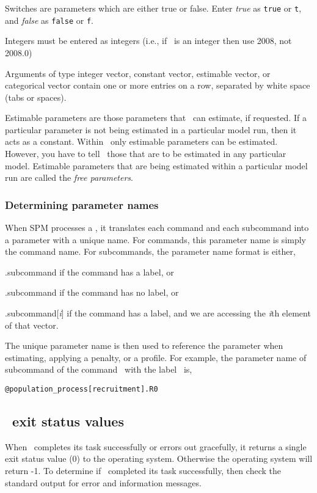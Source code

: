 Switches are parameters which are either true or false. Enter \emph{true} as \texttt{true} or \texttt{t}, and \emph{false} as \texttt{false} or \texttt{f}. 

Integers must be entered as integers (i.e., if \ is an integer then use 2008, not 2008.0)

Arguments of type integer vector, constant vector, estimable vector, or categorical vector contain one or more entries on a row, separated by white space (tabs or spaces). 

Estimable parameters are those parameters that \SPM\ can estimate, if requested. If a particular parameter is not being estimated in a particular model run, then it acts as a constant.  Within \SPM\, only estimable parameters can be estimated. However, you have to tell \SPM\ those that are to be estimated in any particular model. Estimable parameters that are being estimated within a particular model run are called the \emph{free parameters}.

\subsubsection{Determining parameter names}

When SPM processes a \config, it translates each command and each subcommand into a parameter with a unique name. For commands, this parameter name is simply the command name. For subcommands, the parameter name format is either, 

\begin{description}
\item {}.subcommand if the command has a label, or
\item {}.subcommand if the command has no label, or
\item {}.subcommand[\emph{i}] if the command has a label, and we are accessing the \emph{i}th element of that vector.
\end{description} 

The unique parameter name is then used to reference the parameter when estimating, applying a penalty, or a profile. For example, the parameter name of subcommand  of the command \ with the label \ is,

\texttt{@population\_process[recruitment].R0}

\subsection{\SPM\ exit status values}

When \SPM\ completes its task successfully or errors out gracefully, it returns a single exit status value (0) to the operating system. Otherwise the  operating system will return -1. To determine if \SPM\ completed its task successfully, then check the standard output for error and information messages.
